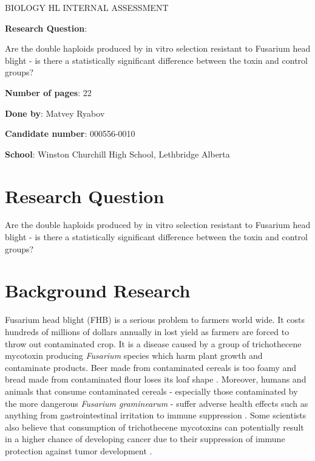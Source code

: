 \documentclass[11pt]{article}
\date{\today}
\title{}
\begin{document}
\begin{center}
\huge
BIOLOGY HL INTERNAL ASSESSMENT

\large
\textbf{Research Question}:

Are the double haploids produced by in vitro selection resistant to Fusarium head blight - is there a statistically significant difference between the toxin and control groups?

\textbf{Number of pages}: 22

\textbf{Done by}: Matvey Ryabov

\textbf{Candidate number}: 000556-0010

\textbf{School}: Winston Churchill High School, Lethbridge Alberta 
\end{center}
\pagebreak
\tableofcontents
\section{Research Question}
\label{sec:org3220863}
Are the double haploids produced by in vitro selection resistant to Fusarium head blight - is there a statistically significant difference between the toxin and control groups?

\section{Background Research}
\label{sec:org6c31159}
Fusarium head blight (FHB) is a serious problem to farmers world wide. It costs hundreds of millions of dollars annually in lost yield \cite{wilson2018economic} as farmers are forced
to throw out contaminated crop. It is a disease 
caused by a group of trichothecene mycotoxin producing \emph{Fusarium} species which harm plant growth
and contaminate products. Beer made from contaminated cereals is too foamy \cite{d1998pesticide} and 
bread made from contaminated flour loses its loaf shape \cite{article}. Moreover, humans and animals that consume contaminated cereals - especially those contaminated by the more
dangerous \emph{Fusarium graminearum} - suffer adverse health effects such as anything from gastrointestinal irritation to immune suppression \cite{korosteleva2009effects}. 
Some scientists also believe that consumption of trichothecene mycotoxins can potentially result in a higher chance of developing cancer due to their suppression
of immune protection against tumor development \cite{berek2001effects}. 
\end{document}
